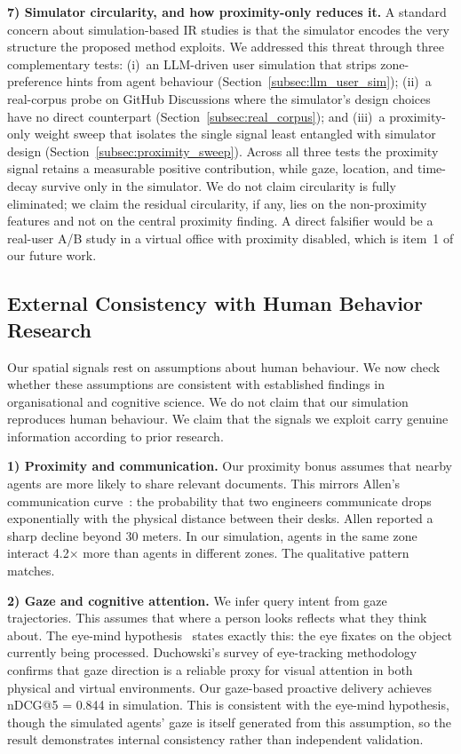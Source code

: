 \documentclass[journal]{IEEEtran}
\begin{document}
\textbf{7) Simulator circularity, and how proximity-only reduces it.}
A standard concern about simulation-based IR studies is that the simulator
encodes the very structure the proposed method exploits. We addressed this
threat through three complementary tests: (i)~an LLM-driven user simulation
that strips zone-preference hints from agent behaviour
(Section~\ref{subsec:llm_user_sim}); (ii)~a real-corpus probe on GitHub
Discussions where the simulator's design choices have no direct counterpart
(Section~\ref{subsec:real_corpus}); and (iii)~a proximity-only weight sweep
that isolates the single signal least entangled with simulator design
(Section~\ref{subsec:proximity_sweep}). Across all three tests the proximity
signal retains a measurable positive contribution, while gaze, location,
and time-decay survive only in the simulator. We do not claim circularity is
fully eliminated; we claim the residual circularity, if any, lies on the
non-proximity features and not on the central proximity finding. A direct
falsifier would be a real-user A/B study in a virtual office with proximity
disabled, which is item~1 of our future work.

\subsection{External Consistency with Human Behavior Research}
\label{subsec:external_consistency}

Our spatial signals rest on assumptions about human behaviour. We now
check whether these assumptions are consistent with established
findings in organisational and cognitive science. We do not claim
that our simulation reproduces human behaviour. We claim that the
signals we exploit carry genuine information according to prior
research.

\textbf{1) Proximity and communication.}
Our proximity bonus assumes that nearby agents are more likely to
share relevant documents. This mirrors Allen's communication
curve~\cite{Allen1977}: the probability that two
engineers communicate drops exponentially with the physical distance
between their desks. Allen reported a sharp decline beyond 30 meters.
In our simulation, agents in the same zone interact 4.2$\times$ more
than agents in different zones. The qualitative pattern matches.

\textbf{2) Gaze and cognitive attention.}
We infer query intent from gaze trajectories. This assumes that
where a person looks reflects what they think about. The eye-mind
hypothesis~\cite{JustCarpenter1980} states exactly this:
the eye fixates on the object currently being processed. Duchowski's
survey of eye-tracking methodology~\cite{Duchowski2017}
confirms that gaze direction is a reliable proxy for visual attention
in both physical and virtual environments. Our gaze-based proactive
delivery achieves nDCG@5 = 0.844 in simulation.  This is consistent
with the eye-mind hypothesis, though the simulated agents' gaze is
itself generated from this assumption, so the result demonstrates
internal consistency rather than independent validation.
\end{document}
